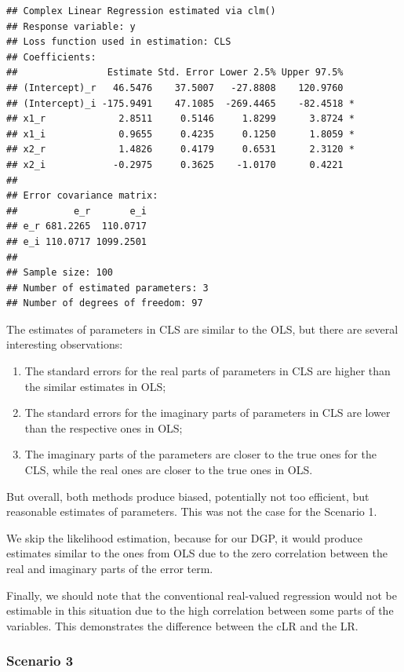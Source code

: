 \documentclass[
]{book}
\providecommand{\tightlist}{%
  \setlength{\itemsep}{0pt}\setlength{\parskip}{0pt}}
\begin{document}
\begin{verbatim}
## Complex Linear Regression estimated via clm()
## Response variable: y
## Loss function used in estimation: CLS
## Coefficients:
##                Estimate Std. Error Lower 2.5% Upper 97.5%  
## (Intercept)_r   46.5476    37.5007   -27.8808    120.9760  
## (Intercept)_i -175.9491    47.1085  -269.4465    -82.4518 *
## x1_r             2.8511     0.5146     1.8299      3.8724 *
## x1_i             0.9655     0.4235     0.1250      1.8059 *
## x2_r             1.4826     0.4179     0.6531      2.3120 *
## x2_i            -0.2975     0.3625    -1.0170      0.4221  
## 
## Error covariance matrix:
##          e_r       e_i
## e_r 681.2265  110.0717
## e_i 110.0717 1099.2501
## 
## Sample size: 100
## Number of estimated parameters: 3
## Number of degrees of freedom: 97
\end{verbatim}

The estimates of parameters in CLS are similar to the OLS, but there are several interesting observations:

\begin{enumerate}
\def\labelenumi{\arabic{enumi}.}
\tightlist
\item
  The standard errors for the real parts of parameters in CLS are higher than the similar estimates in OLS;
\item
  The standard errors for the imaginary parts of parameters in CLS are lower than the respective ones in OLS;
\item
  The imaginary parts of the parameters are closer to the true ones for the CLS, while the real ones are closer to the true ones in OLS.
\end{enumerate}

But overall, both methods produce biased, potentially not too efficient, but reasonable estimates of parameters. This was not the case for the Scenario 1.

We skip the likelihood estimation, because for our DGP, it would produce estimates similar to the ones from OLS due to the zero correlation between the real and imaginary parts of the error term.

Finally, we should note that the conventional real-valued regression would not be estimable in this situation due to the high correlation between some parts of the variables. This demonstrates the difference between the cLR and the LR.

\hypertarget{scenario-3}{%
\subsubsection*{Scenario 3}\label{scenario-3}}
\end{document}
